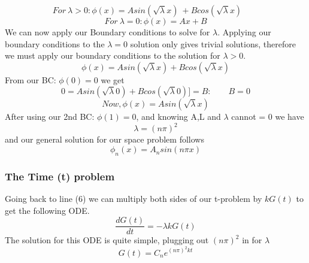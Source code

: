 \documentclass[12pt, reqno]{amsart}
\begin{document}
\begin{equation*}
For\ \lambda > 0: \phi(x) = Asin(\sqrt{\lambda}x)\ + Bcos(\sqrt{\lambda}x)\quad\quad
\end{equation*}
\begin{equation*}
    For\  \lambda = 0: \phi(x) = Ax + B
\end{equation*}
We can now apply our Boundary conditions to solve for $\lambda$. Applying our boundary conditions to the $\lambda = 0$ solution only gives trivial solutions, therefore we must apply our boundary conditions to the solution for $\lambda > 0$.
\begin{equation*}
\phi(x) = Asin(\sqrt{\lambda}x) + Bcos(\sqrt{\lambda}x)
\end{equation*}
From our BC: $\phi(0) = 0$ we get
\begin{equation*}
0 = Asin(\sqrt{\lambda}0) + Bcos(\sqrt{\lambda}0)] = B:
\quad \quad B = 0
\end{equation*}
\begin{equation*}
Now, \phi(x) = Asin(\sqrt{\lambda}x)
\end{equation*}
After using our 2nd BC: $\phi(1) = 0$, and knowing A,L and $\lambda$ cannot = 0 we have
\begin{equation*}
\lambda = (n\pi)^2
\end{equation*}
and our general solution for our space problem follows
\begin{equation*}
\phi_n(x) = A_nsin(n\pi x)
\end{equation*}

\subsubsection{The Time (t) problem}Going back to line (6) we can multiply both sides of our t-problem by $kG(t)$ to get the following ODE.
\begin{equation*}
\frac{dG(t)}{dt} = -\lambda kG(t)
\end{equation*}
The solution for this ODE is quite simple, plugging out $(n\pi)^2$ in for $\lambda$
\begin{equation*}
G(t) = C_ne^{(n\pi)^2kt}
\end{equation*}
\end{document}
